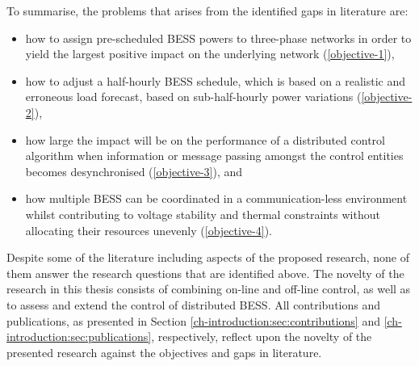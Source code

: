 To summarise, the problems that arises from the identified gaps in literature are:

\begin{itemize}
	\item how to assign pre-scheduled BESS powers to three-phase networks in order to yield the largest positive impact on the underlying network (\ref{objective-1}),
	\item how to adjust a half-hourly BESS schedule, which is based on a realistic and erroneous load forecast, based on sub-half-hourly power variations (\ref{objective-2}),
	\item how large the impact will be on the performance of a distributed control algorithm when information or message passing amongst the control entities becomes desynchronised (\ref{objective-3}), and
	\item how multiple BESS can be coordinated in a communication-less environment whilst contributing to voltage stability and thermal constraints without allocating their resources unevenly (\ref{objective-4}).
\end{itemize}

Despite some of the literature including aspects of the proposed research, none of them answer the research questions that are identified above.
The novelty of the research in this thesis consists of combining on-line and off-line control, as well as to assess and extend the control of distributed BESS.
All contributions and publications, as presented in Section \ref{ch-introduction:sec:contributions} and \ref{ch-introduction:sec:publications}, respectively, reflect upon the novelty of the presented research against the objectives and gaps in literature.

